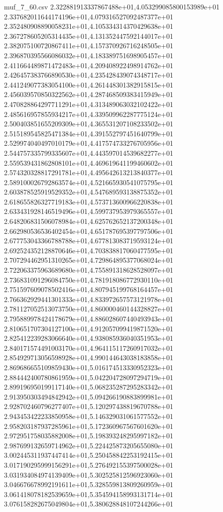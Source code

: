 \begin{filecontents*}{muf_7_60.csv}
2.322881913337867488e+01,4.053299085800153989e+01
2.337682011644174196e+01,4.079316527092487377e+01
2.352480908890058231e+01,4.105334314370429638e+01
2.367278605205314435e+01,4.131352447592144017e+01
2.382075100720867411e+01,4.157370926716248505e+01
2.396870395566086032e+01,4.183389751698905457e+01
2.411664489871472483e+01,4.209408922498914762e+01
2.426457383766890530e+01,4.235428439074348717e+01
2.441249077383054100e+01,4.261448301382915815e+01
2.456039570850322562e+01,4.287468509383415949e+01
2.470828864297711291e+01,4.313489063032102422e+01
2.485616957855934217e+01,4.339509962287775124e+01
2.500403851655209309e+01,4.365531207108233502e+01
2.515189545825471384e+01,4.391552797451640799e+01
2.529974040497010179e+01,4.417574733276705956e+01
2.544757335799335607e+01,4.443597014539682277e+01
2.559539431862808101e+01,4.469619641199460602e+01
2.574320328817291781e+01,4.495642613213840377e+01
2.589100026792863574e+01,4.521665930541075795e+01
2.603878525919529352e+01,4.547689593138875352e+01
2.618655826327719183e+01,4.573713600966220838e+01
2.633431928146519496e+01,4.599737953979365557e+01
2.648206831506078984e+01,4.625762652137200348e+01
2.662980536536402454e+01,4.651787695397797506e+01
2.677753043366788788e+01,4.677813083719593124e+01
2.692524352128870646e+01,4.703838817060477595e+01
2.707294462951310265e+01,4.729864895377068024e+01
2.722063375963689680e+01,4.755891318628528097e+01
2.736831091296084750e+01,4.781918086772930110e+01
2.751597609078502416e+01,4.807945199768164457e+01
2.766362929441301333e+01,4.833972657573121978e+01
2.781127052513073750e+01,4.860000460144328827e+01
2.795889978424178679e+01,4.886028607440493943e+01
2.810651707304127100e+01,4.912057099419871520e+01
2.825412239283066640e+01,4.938085936040351953e+01
2.840171574491003170e+01,4.964115117260917032e+01
2.854929713056598928e+01,4.990144643038183858e+01
2.869686655109859430e+01,5.016174513330952323e+01
2.884442400780861959e+01,5.042204728097294719e+01
2.899196950199117140e+01,5.068235287295283342e+01
2.913950303494842942e+01,5.094266190883899981e+01
2.928702460796277407e+01,5.120297438819670788e+01
2.943453422233850958e+01,5.146329031061577552e+01
2.958203187937285961e+01,5.172360967567601620e+01
2.972951758035882008e+01,5.198393248295997182e+01
2.987699132659714962e+01,5.224425873205655080e+01
3.002445311937447414e+01,5.250458842253192415e+01
3.017190295999156291e+01,5.276492155397500028e+01
3.031934084974139409e+01,5.302525812596923060e+01
3.046676678992191611e+01,5.328559813809260959e+01
3.061418078182539659e+01,5.354594158993131714e+01
3.076158282675049804e+01,5.380628848107244266e+01

\end{filecontents*}
